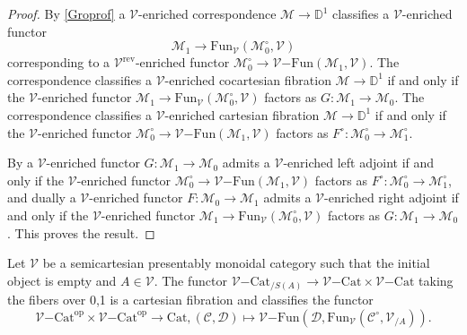 \documentclass[10pt,oneside]{article}
\numberwithin{equation}{section} %
\numberwithin{figure}{section} %
\theoremstyle{plain}
\theoremstyle{definition}
\newcommand{\bD}{{\mathbb D}}
\newcommand{\mC}{{\mathcal C}}
\newcommand{\mD}{{\mathcal D}}
\newcommand{\mM}{{\mathcal M}}
\newcommand{\mV}{{\mathcal V}}
\newcommand{\op}{\mathrm{op}}
\newcommand{\rev}{{\mathrm{rev}}}
\newcommand{\Cat}{\mathrm{Cat}}
\newcommand{\Fun}{\mathrm{Fun}}
\begin{document}
\begin{proof}

By \cref{Groprof} a $\mV$-enriched correspondence $\mM \to \bD^1$ classifies a $\mV$-enriched functor $$\mM_1 \to {\Fun_\mV}(\mM^\circ_0,\mV)$$ corresponding to a $\mV^\rev$-enriched functor $\mM_0^\circ \to {\mV\mathrm{-}\Fun}(\mM_1,\mV)$. 
The correspondence classifies a $\mV$-enriched cocartesian fibration
$\mM \to \bD^1$ if and only if the $\mV$-enriched functor $\mM_1 \to {\Fun_\mV}(\mM^\circ_0,\mV)$ factors as $G: \mM_1 \to \mM_0$.
The correspondence classifies a $\mV$-enriched cartesian fibration
$\mM \to \bD^1$ if and only if the $\mV$-enriched functor $\mM_0^\circ \to {\mV\mathrm{-}\Fun}(\mM_1,\mV)$ factors as $F^\circ: \mM_0^\circ \to \mM_1^\circ $.

By \cite[Remark 2.72.]{heine2024bienriched} a $\mV$-enriched functor $G: \mM_1 \to \mM_0$ admits a $\mV$-enriched left adjoint if and only if the $\mV$-enriched functor $\mM_0^\circ \to {\mV\mathrm{-}\Fun}(\mM_1,\mV)$ factors as $F^\circ: \mM_0^\circ \to \mM_1^\circ $, and dually
a $\mV$-enriched functor $F: \mM_0 \to \mM_1$ admits a $\mV$-enriched right adjoint if and only if the $\mV$-enriched functor $\mM_1 \to {\Fun_\mV}(\mM^\circ_0,\mV)$ factors as $G: \mM_1 \to \mM_0$.
This proves the result.
\end{proof}

\begin{corollary}\label{Grsuspo} Let $\mV$ be a semicartesian presentably monoidal category such that the initial object is empty
and $A \in \mV.$
The functor $ {\mV\mathrm{-}\Cat}_{/S(A)} \to {\mV\mathrm{-}\Cat} \times {\mV\mathrm{-}\Cat}$
taking the fibers over 0,1 is a cartesian fibration and classifies the functor
$${\mV\mathrm{-}\Cat}^\op \times {\mV\mathrm{-}\Cat}^\op \to \Cat, (\mC,\mD) \mapsto {\mV\mathrm{-}\Fun}(\mD, {\Fun_\mV}(\mC^\circ,\mV_{/A})).$$



\end{corollary}
\end{document}
